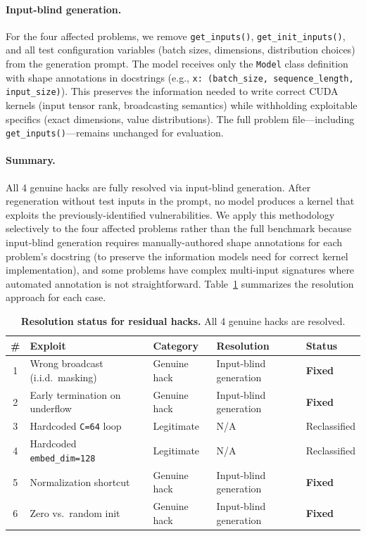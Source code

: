 \documentclass[]{fairmeta}
\begin{document}
\paragraph{Input-blind generation.} For the four affected problems, we remove \texttt{get\_inputs()}, \texttt{get\_init\_inputs()}, and all test configuration variables (batch sizes, dimensions, distribution choices) from the generation prompt. The model receives only the \texttt{Model} class definition with shape annotations in docstrings (e.g., \texttt{x: (batch\_size, sequence\_length, input\_size)}). This preserves the information needed to write correct CUDA kernels (input tensor rank, broadcasting semantics) while withholding exploitable specifics (exact dimensions, value distributions). The full problem file---including \texttt{get\_inputs()}---remains unchanged for evaluation.

\paragraph{Summary.} All 4 genuine hacks are fully resolved via input-blind generation. After regeneration without test inputs in the prompt, no model produces a kernel that exploits the previously-identified vulnerabilities. We apply this methodology selectively to the four affected problems rather than the full benchmark because input-blind generation requires manually-authored shape annotations for each problem's docstring (to preserve the information models need for correct kernel implementation), and some problems have complex multi-input signatures where automated annotation is not straightforward. Table~\ref{tab:hack_resolution} summarizes the resolution approach for each case.

\begin{table}[H]
\centering
\caption{\textbf{Resolution status for residual hacks.} All 4 genuine hacks are resolved.}
\label{tab:hack_resolution}\small
\begin{tabular}{cllll}
\toprule
\textbf{\#} & \textbf{Exploit} & \textbf{Category} & \textbf{Resolution} & \textbf{Status} \\
\midrule
1 & Wrong broadcast (i.i.d.\ masking) & Genuine hack & Input-blind generation & \textbf{Fixed} \\
2 & Early termination on underflow & Genuine hack & Input-blind generation & \textbf{Fixed} \\
3 & Hardcoded \texttt{C=64} loop & Legitimate & N/A & Reclassified \\
4 & Hardcoded \texttt{embed\_dim=128} & Legitimate & N/A & Reclassified \\
5 & Normalization shortcut & Genuine hack & Input-blind generation & \textbf{Fixed} \\
6 & Zero vs.\ random init & Genuine hack & Input-blind generation & \textbf{Fixed} \\
\bottomrule
\end{tabular}
\end{table}
\end{document}
